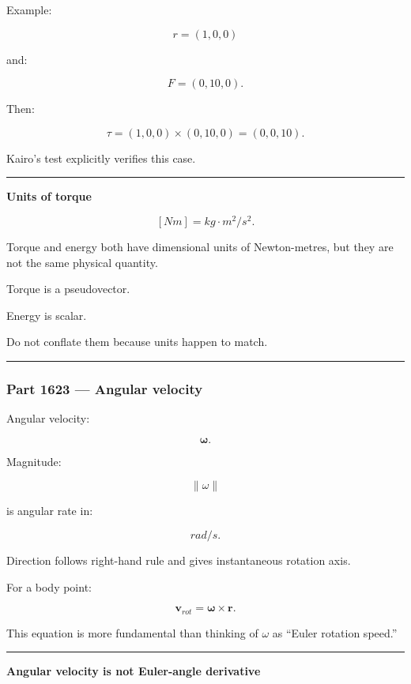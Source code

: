 Example:

\[
r=(1,0,0)
\]

and:

\[
F=(0,10,0).
\]

Then:

\[
\tau
=
(1,0,0)
\times
(0,10,0)
=
(0,0,10).
\]

Kairo's test explicitly verifies this case.

\begin{center}\rule{0.5\linewidth}{0.5pt}\end{center}

\textbf{Units of torque}

\[
[Nm]
=
kg\cdot m^2/s^2.
\]

Torque and energy both have dimensional units of Newton-metres, but they are not the same physical quantity.

Torque is a pseudovector.

Energy is scalar.

Do not conflate them because units happen to match.

\begin{center}\rule{0.5\linewidth}{0.5pt}\end{center}

\subsubsection{Part 1623 --- Angular velocity}\label{part-1623-angular-velocity}

Angular velocity:

\[
\boldsymbol{\omega}.
\]

Magnitude:

\[
\|\omega\|
\]

is angular rate in:

\[
rad/s.
\]

Direction follows right-hand rule and gives instantaneous rotation axis.

For a body point:

\[
\boxed{
\mathbf{v}_{rot}
=
\boldsymbol{\omega}\times\mathbf{r}.
}
\]

This equation is more fundamental than thinking of \(\omega\) as ``Euler rotation speed.''

\begin{center}\rule{0.5\linewidth}{0.5pt}\end{center}

\textbf{Angular velocity is not Euler-angle derivative}

